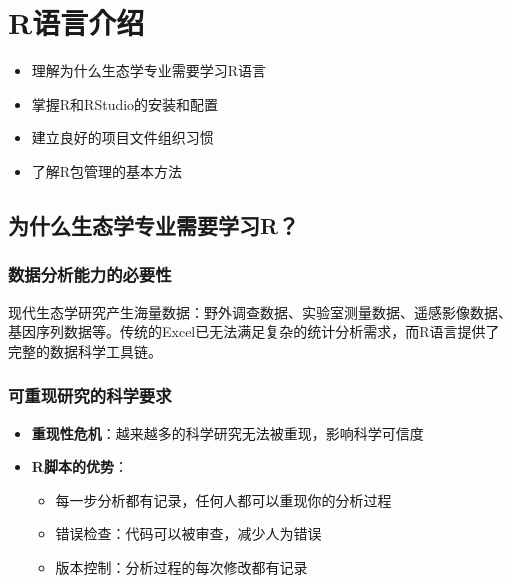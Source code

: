 \documentclass[
]{book}
\providecommand{\tightlist}{%
  \setlength{\itemsep}{0pt}\setlength{\parskip}{0pt}}
\begin{document}
\hypertarget{rux8bedux8a00ux4ecbux7ecd}{%
\section{R语言介绍}\label{rux8bedux8a00ux4ecbux7ecd}}

\begin{itemize}
\tightlist
\item
  理解为什么生态学专业需要学习R语言
\item
  掌握R和RStudio的安装和配置
\item
  建立良好的项目文件组织习惯
\item
  了解R包管理的基本方法
\end{itemize}

\hypertarget{ux4e3aux4ec0ux4e48ux751fux6001ux5b66ux4e13ux4e1aux9700ux8981ux5b66ux4e60r}{%
\subsection{为什么生态学专业需要学习R？}\label{ux4e3aux4ec0ux4e48ux751fux6001ux5b66ux4e13ux4e1aux9700ux8981ux5b66ux4e60r}}

\hypertarget{ux6570ux636eux5206ux6790ux80fdux529bux7684ux5fc5ux8981ux6027}{%
\subsubsection{数据分析能力的必要性}\label{ux6570ux636eux5206ux6790ux80fdux529bux7684ux5fc5ux8981ux6027}}

现代生态学研究产生海量数据：野外调查数据、实验室测量数据、遥感影像数据、基因序列数据等。传统的Excel已无法满足复杂的统计分析需求，而R语言提供了完整的数据科学工具链。

\hypertarget{ux53efux91cdux73b0ux7814ux7a76ux7684ux79d1ux5b66ux8981ux6c42}{%
\subsubsection{可重现研究的科学要求}\label{ux53efux91cdux73b0ux7814ux7a76ux7684ux79d1ux5b66ux8981ux6c42}}

\begin{itemize}
\tightlist
\item
  \textbf{重现性危机}：越来越多的科学研究无法被重现，影响科学可信度
\item
  \textbf{R脚本的优势}：

  \begin{itemize}
  \tightlist
  \item
    每一步分析都有记录，任何人都可以重现你的分析过程
  \item
    错误检查：代码可以被审查，减少人为错误
  \item
    版本控制：分析过程的每次修改都有记录
  \end{itemize}
\end{itemize}
\end{document}

